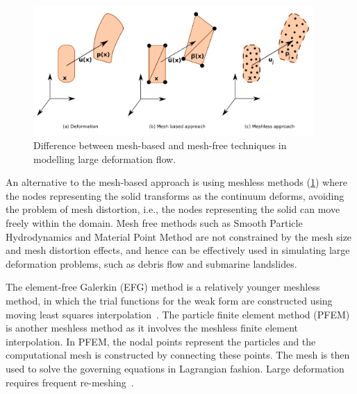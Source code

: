 \begin{figure}[tbhp]
\centering
\includegraphics[width=0.95\textwidth]{NumericalMethods}
\caption{Difference between mesh-based and mesh-free techniques in modelling 
large deformation flow.}
\label{fig:NumericalMethods}
\end{figure}

An alternative to the mesh-based approach is using meshless methods 
(\cref{fig:NumericalMethods}) where the 
nodes representing the solid transforms as the continuum deforms, avoiding 
the problem of mesh distortion, i.e., the nodes representing the solid can move 
freely within the domain. Mesh free methods such as Smooth Particle 
Hydrodynamics and Material Point Method are not constrained by the mesh size 
and mesh distortion effects, and hence can be effectively used in simulating 
large deformation problems, such as debris flow and submarine landslides.


The element-free Galerkin (EFG) method is a relatively younger meshless method, 
in which the trial functions for the weak form are constructed using moving 
least squares interpolation~\citep{Belytschko1994}. The particle finite element 
method (PFEM) is another meshless method as it involves the meshless finite 
element interpolation. In PFEM, the nodal points represent the particles and 
the computational mesh is constructed by connecting these points. The mesh is 
then used to solve the governing equations in Lagrangian fashion. Large 
deformation requires frequent re-meshing~\citep{Kafaji2013}.


